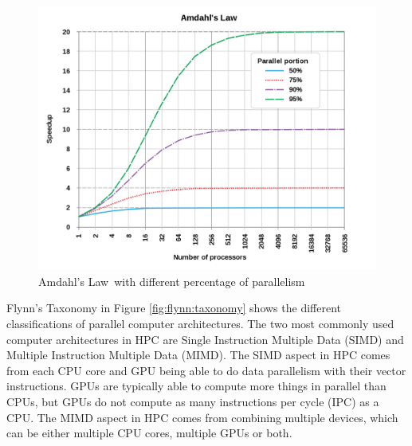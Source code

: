 \begin{figure}[H]
    \centering
    \includegraphics[scale=0.17]{Figures/amdahl.png}
    \caption[]{Amdahl's Law\protect\footnotemark\ with different percentage of parallelism}
    \label{fig:amdahl}
\end{figure} 

Flynn's Taxonomy in Figure \ref{fig:flynn:taxonomy} shows the different classifications of parallel computer architectures. The two most commonly used computer architectures in HPC are Single Instruction Multiple Data (SIMD) and Multiple Instruction Multiple Data (MIMD). The SIMD aspect in HPC comes from each CPU core and GPU being able to do data parallelism with their vector instructions. GPUs are typically able to compute more things in parallel than CPUs, but GPUs do not compute as many instructions per cycle (IPC) as a CPU. The MIMD aspect in HPC comes from combining multiple devices, which can be either multiple CPU cores, multiple GPUs or both.

